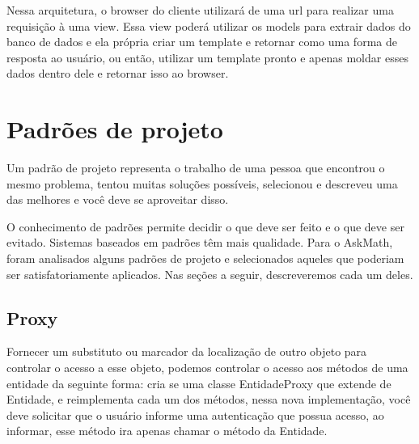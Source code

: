 \begin{figure}[h!]
	\centering
\end{figure}


Nessa arquitetura, o browser do cliente utilizar\'a de uma \gls{url} para realizar uma 
requisição \`a uma view. Essa view poder\'a utilizar os models para extrair dados do 
banco de dados e ela própria criar um template e retornar como uma forma 
de resposta ao usuário, ou então, utilizar um template pronto e apenas 
moldar esses dados dentro dele e retornar isso ao browser. 

\section{Padrões de projeto}
Um padrão de projeto representa o trabalho de uma pessoa que encontrou o mesmo 
problema, tentou muitas soluções possíveis, selecionou e descreveu uma das 
melhores e você deve se aproveitar disso.

O conhecimento de padrões permite decidir o que deve ser feito e o que deve ser 
evitado. Sistemas baseados em padrões têm mais qualidade. Para o AskMath, foram analisados alguns padrões  de projeto e selecionados aqueles que poderiam ser satisfatoriamente aplicados. Nas 
se\c{c}\~oes a seguir, descreveremos cada um deles.

\subsection{Proxy}
Fornecer um substituto ou marcador da localização de outro objeto para controlar 
o acesso a esse objeto, podemos controlar o acesso aos métodos de uma entidade 
da seguinte forma: cria se uma classe EntidadeProxy que extende de Entidade, e 
reimplementa cada um dos métodos, nessa nova implementação, você deve solicitar que o 
usuário informe uma autenticação que possua acesso, ao informar, esse método ira 
apenas chamar o método da Entidade.   

